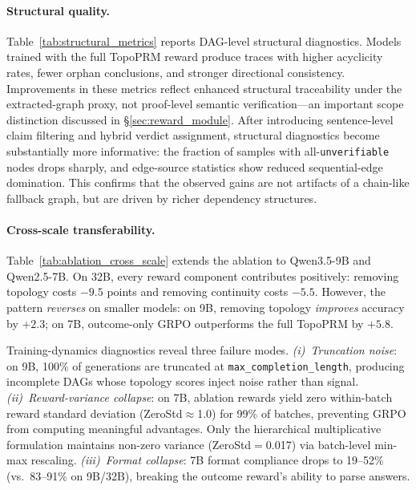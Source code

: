 \paragraph{Structural quality.}
Table~\ref{tab:structural_metrics} reports DAG-level structural diagnostics.
Models trained with the full TopoPRM reward produce traces with higher acyclicity rates, fewer orphan conclusions, and stronger directional consistency.
Improvements in these metrics reflect enhanced structural traceability under the extracted-graph proxy, not proof-level semantic verification---an important scope distinction discussed in \S\ref{sec:reward_module}.
After introducing sentence-level claim filtering and hybrid verdict assignment, structural diagnostics become substantially more informative:
the fraction of samples with all-\texttt{unverifiable} nodes drops sharply, and edge-source statistics show reduced sequential-edge domination.
This confirms that the observed gains are not artifacts of a chain-like fallback graph, but are driven by richer dependency structures.



\paragraph{Cross-scale transferability.}
\label{sec:analysis}
Table~\ref{tab:ablation_cross_scale} extends the ablation to Qwen3.5-9B and Qwen2.5-7B.
On 32B, every reward component contributes positively: removing topology costs $-9.5$ points and removing continuity costs $-5.5$.
However, the pattern \emph{reverses} on smaller models: on 9B, removing topology \emph{improves} accuracy by $+2.3$; on 7B, outcome-only GRPO outperforms the full TopoPRM by $+5.8$.

Training-dynamics diagnostics reveal three failure modes.
\emph{(i)~Truncation noise}: on 9B, 100\% of generations are truncated at \texttt{max\_completion\_length}, producing incomplete DAGs whose topology scores inject noise rather than signal.
\emph{(ii)~Reward-variance collapse}: on 7B, ablation rewards yield zero within-batch reward standard deviation (ZeroStd$\approx$1.0) for 99\% of batches, preventing GRPO from computing meaningful advantages.
Only the hierarchical multiplicative formulation maintains non-zero variance (ZeroStd$=$0.017) via batch-level min-max rescaling.
\emph{(iii)~Format collapse}: 7B format compliance drops to 19--52\% (vs.\ 83--91\% on 9B/32B), breaking the outcome reward's ability to parse answers.

